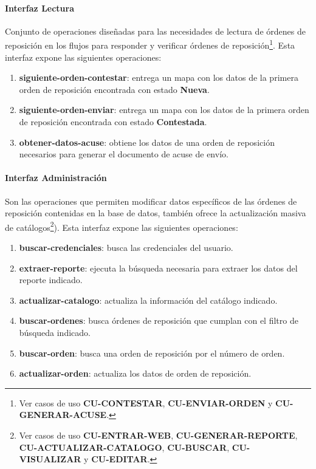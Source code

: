\paragraph{\indent Interfaz Lectura\\}
Conjunto de operaciones diseñadas para las necesidades de lectura de órdenes de reposición en los flujos para responder y verificar órdenes de reposición\footnote{Ver casos de uso \textbf{CU-CONTESTAR}, \textbf{CU-ENVIAR-ORDEN} y \textbf{CU-GENERAR-ACUSE}.}. Esta interfaz expone las siguientes operaciones:
\begin{enumerate}
	\item \textbf{siguiente-orden-contestar}: entrega un mapa con los datos de la primera orden de reposición encontrada con estado \textbf{Nueva}.
	\item \textbf{siguiente-orden-enviar}: entrega un mapa con los datos de la primera orden de reposición encontrada con estado \textbf{Contestada}.
	\item \textbf{obtener-datos-acuse}: obtiene los datos de una orden de reposición necesarios para generar el documento de acuse de envío.
\end{enumerate}

\paragraph{\indent Interfaz Administración\\}
Son las operaciones que permiten modificar datos específicos de las órdenes de reposición contenidas en la base de datos, también ofrece la actualización masiva de catálogos\footnote{Ver casos de uso \textbf{CU-ENTRAR-WEB}, \textbf{CU-GENERAR-REPORTE}, \textbf{CU-ACTUALIZAR-CATALOGO}, \textbf{CU-BUSCAR}, \textbf{CU-VISUALIZAR} y \textbf{CU-EDITAR}.}). Esta interfaz expone las siguientes operaciones:
\begin{enumerate}
	\item \textbf{buscar-credenciales}: busca las credenciales del usuario.
	\item \textbf{extraer-reporte}: ejecuta la búsqueda necesaria para extraer los datos del reporte indicado.
	\item \textbf{actualizar-catalogo}: actualiza la información del catálogo indicado.
	\item \textbf{buscar-ordenes}: busca órdenes de reposición que cumplan con el filtro de búsqueda indicado.
	\item \textbf{buscar-orden}: busca una orden de reposición por el número de orden.
	\item \textbf{actualizar-orden}: actualiza los datos de orden de reposición.
\end{enumerate}

